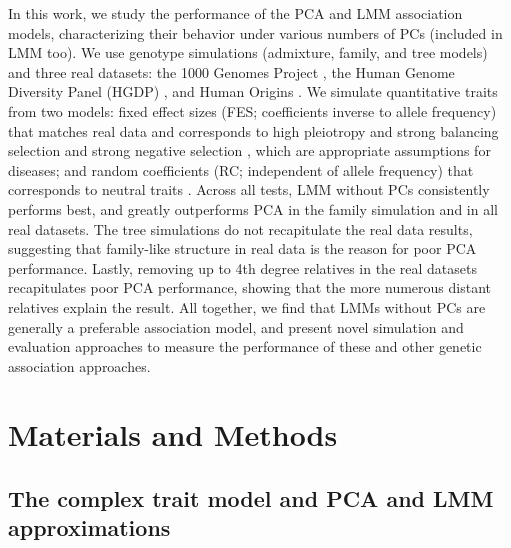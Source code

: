 \documentclass[11pt]{article}
\begin{document}
In this work, we study the performance of the PCA and LMM association models, characterizing their behavior under various numbers of PCs (included in LMM too).
We use genotype simulations (admixture, family, and tree models) and three real datasets: the 1000 Genomes Project \citep{the_1000_genomes_project_consortium_map_2010, 1000_genomes_project_consortium_integrated_2012}, the Human Genome Diversity Panel (HGDP) \citep{cann_human_2002, rosenberg_genetic_2002, bergstrom_insights_2020}, and Human Origins \citep{patterson_ancient_2012, lazaridis_ancient_2014, lazaridis_genomic_2016, skoglund_genomic_2016}.
We simulate quantitative traits from two models: fixed effect sizes (FES; coefficients inverse to allele frequency) that matches real data \citep{park_distribution_2011, zeng_signatures_2018, oconnor_extreme_2019} and corresponds to high pleiotropy and strong balancing selection \citep{simons_population_2018} and strong negative selection \citep{zeng_signatures_2018, oconnor_extreme_2019}, which are appropriate assumptions for diseases; and random coefficients (RC; independent of allele frequency) that corresponds to neutral traits \citep{zeng_signatures_2018, simons_population_2018}.
Across all tests, LMM without PCs consistently performs best, and greatly outperforms PCA in the family simulation and in all real datasets.
The tree simulations do not recapitulate the real data results, suggesting that family-like structure in real data is the reason for poor PCA performance.
Lastly, removing up to 4th degree relatives in the real datasets recapitulates poor PCA performance, showing that the more numerous distant relatives explain the result.
All together, we find that LMMs without PCs are generally a preferable association model, and present novel simulation and evaluation approaches to measure the performance of these and other genetic association approaches.

\section{Materials and Methods}

\subsection{The complex trait model and PCA and LMM approximations}
\end{document}
